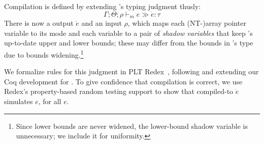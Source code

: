 
Compilation is defined by extending \lang's
typing judgment thusly:
\[\Gamma;\Theta;\rho \vdash_m e \gg \dot e:\tau\]
There is now a \elang output $\dot e$ and an input $\rho$, which maps
each (NT-)array pointer variable to its mode and
each variable  to a pair of \emph{shadow
  variables} that keep 's up-to-date upper and lower bounds; 
these may differ from the bounds in 's type due to bounds
widening.\footnote{Since lower bounds are never widened, the
  lower-bound shadow variable is unnecessary; we include it for uniformity.}

We formalize rules for this judgment in PLT Redex~\cite{pltredex},
following and extending our Coq development for \lang. To give
confidence that compilation is correct, we use Redex's property-based
random testing support to show that compiled-to $\dot e $ simulates
$e$, for all $e$.


